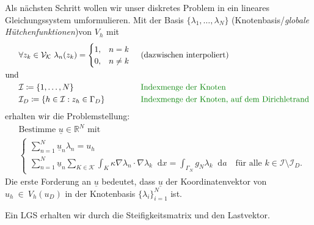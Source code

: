 \documentclass[12pt,a4paper]{scrartcl}
\newcommand{\R}{\mathbb{R}}
\newcommand*\diff{\mathop{}\!\mathrm{d}}
\newcommand{\defi}[1]{\textcolor{Mygreen}{#1}}
\numberwithin{equation}{section}
\begin{document}
\begin{enumerate}[label=(\roman*)]
Als nächsten Schritt wollen wir unser diskretes Problem in ein lineares Gleichungssystem umformulieren. 
	Mit der Basis $ \{\lambda_1, \dots , \lambda_N\} $ (\defi{Knotenbasis}/\emph{globale Hütchenfunktionen})von $V_h$ mit
	\begin{align*}
		&\forall z_k \in \mathcal{V}_\mathcal{K} \ \lambda_n(z_k) = 
		\begin{cases}
			1, &n=k\\
			0, &n\neq k
		\end{cases}
		\ &&(\text{dazwischen interpoliert})\\
	\text{und} \\
		&\mathcal{I} \coloneqq \{ 1, \dots , N \}  &&\text{\defi{Indexmenge der Knoten}} \\
		&\mathcal{I}_D \coloneqq \{ h \in \mathcal{I} : z_h \in \Gamma_D \}  &&\text{\defi{Indexmenge der Knoten, auf dem Dirichletrand }}
	\end{align*}
	erhalten wir die Problemstellung:
	\begin{align*}
		&\text{Bestimme } \underline{u} \in \R^N \text{ mit }\\
		&\begin{cases}
			\sum_{n = 1}^N \underline{u}_n \lambda_n = u_h  \\
			\sum_{n=1}^{N} \underline{u}_n \sum_{K \in \mathcal{K}} \int_{K} \kappa \nabla \lambda_n \cdot \nabla \lambda_k \diff x = \int_{\Gamma_N} g_N \lambda_k \diff a \quad \text{für alle }k \in \mathcal{I}\setminus\mathcal{I}_D.
		\end{cases}
	\end{align*}
	Die erste Forderung an $ \underline{u} $ bedeutet, dass $\underline{u} $ der Koordinatenvektor von $ u_h~\in~V_h(u_D) $ in der Knotenbasis  $ \{ \lambda_i \}_{i = 1}^N $ ist.
	
	Ein LGS erhalten wir durch die Steifigkeitsmatrix und den Lastvektor. 
	

\end{enumerate}
\end{document}
